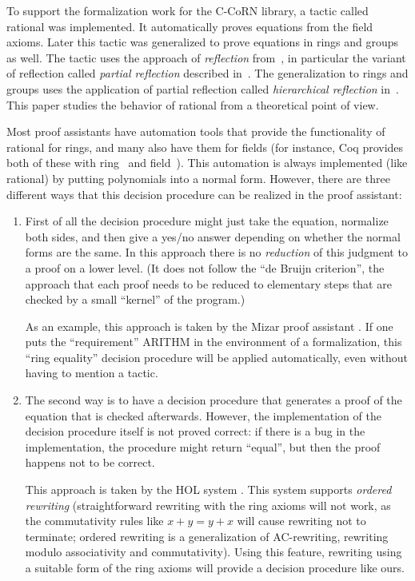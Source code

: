 \documentclass[numreferences]{kluwer}
\newcommand{\tacticname}[1]{\textsf{#1}}
\newcommand{\rational}{\tacticname{rational}}
\begin{document}
\begin{article}
To support the formalization work for the C-CoRN library,
a tactic called {\rational} was implemented.
It automatically proves equations from the field axioms.
Later this tactic was generalized to prove equations in
rings and groups as well.
The tactic uses the approach of \emph{reflection} from~\cite{ACHA90},
in particular the variant of reflection called \emph{partial reflection}
described in~\cite{geu:wie:zwa:00}.
The generalization to rings and groups uses the application
of partial reflection called \emph{hierarchical reflection} in~\cite{lcf:wie:04}.
This paper studies the behavior of {\rational} from a theoretical
point of view.

Most proof assistants have automation tools that provide the
functionality of {\rational} for rings, and many also have them for
fields (for instance, Coq provides both of these
with \tacticname{ring}~\cite{coqmanual} and
\tacticname{field}~\cite{del:may:01}).  This automation is always
implemented (like {\rational}) by putting polynomials into a normal
form.
%
However, there are three different ways that this decision procedure can
be realized in the proof assistant:
\begin{enumerate}
\item
First of all the decision procedure might just take the equation,
normalize both sides, and then give a yes/no answer depending on whether
the normal forms are the same.
In this approach there is no \emph{reduction} of this judgment
to a proof on a lower level.
(It does not follow the ``de Bruijn criterion'', the approach that
each proof needs to be reduced to elementary steps that are checked
by a small ``kernel'' of the program.)

As an example, this approach is taken
by the Mizar proof assistant \cite{muz:93}.
If one puts the ``requirement'' \tacticname{ARITHM} in the environment
of a formalization, this ``ring equality'' decision procedure will be applied
automatically, even without having to mention a tactic.

\item
The second way is to have a decision procedure that generates
a proof of the equation that is checked afterwards.
However, the implementation of the decision procedure itself is
not proved correct:
if there is a bug in the implementation,
the procedure might return ``equal'', but
then the proof happens not to be correct.

This approach is taken by the HOL system \cite{har:00}.
This system supports \emph{ordered rewriting}
(straightforward rewriting with the ring axioms will not work, as
the commutativity rules like $x + y = y + x$ will cause rewriting
not to terminate; ordered rewriting is a generalization of AC-rewriting,
rewriting modulo associativity and commutativity).
Using this feature, rewriting using a suitable form of the ring axioms
will provide a decision procedure like ours.


\end{enumerate}
\end{article}
\end{document}

